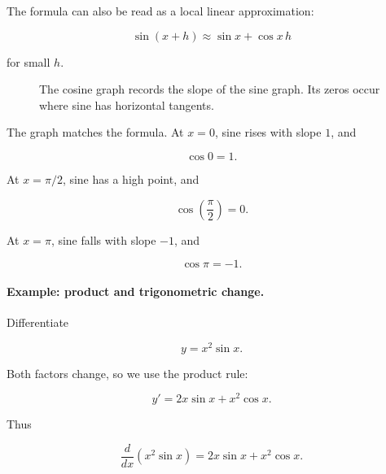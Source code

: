 The formula can also be read as a local linear approximation:

\[
\boxed{
\sin(x+h)
\approx
\sin x+\cos x\,h
}
\]

for small \(h\).

\begin{figure}[h]
\centering
{}
\caption{The cosine graph records the slope of the sine graph. Its zeros occur where sine has horizontal tangents.}
\label{fig:sine-derivative-cosine}
\end{figure}

The graph matches the formula. At \(x=0\), sine rises with slope \(1\), and

\[
\cos0=1.
\]

At \(x=\pi/2\), sine has a high point, and

\[
\cos\left(\frac{\pi}{2}\right)=0.
\]

At \(x=\pi\), sine falls with slope \(-1\), and

\[
\cos\pi=-1.
\]

\paragraph{Example: product and trigonometric change.}
Differentiate

\[
y=x^2\sin x.
\]

Both factors change, so we use the product rule:

\[
y'
=
2x\sin x+x^2\cos x.
\]

Thus

\[
\boxed{
\frac{d}{dx}\left(x^2\sin x\right)
=
2x\sin x+x^2\cos x.
}
\]

